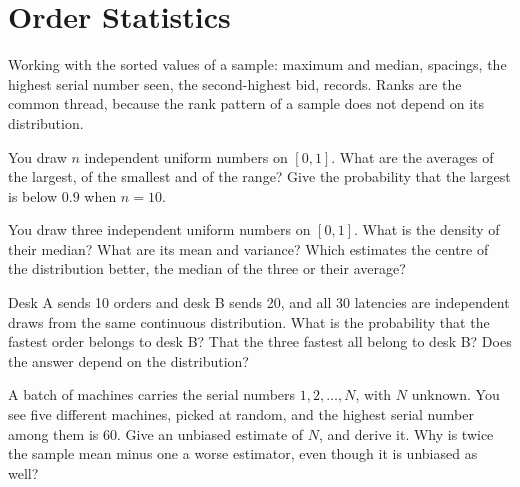 \chapter{Order Statistics}\label{ch:iv1:order-statistics}

\begin{ivtrains}
Working with the sorted values of a sample: maximum and median, spacings, the highest serial number seen, the second-highest bid, records. Ranks are the common thread, because the rank pattern of a sample does not depend on its distribution.
\end{ivtrains}

\begin{question}\label{iq:iv1:order-statistics:1}
You draw $n$ independent uniform numbers on $[0, 1]$. What are the averages of the largest, of the smallest and of the range? Give the probability that the largest is below $0.9$ when $n = 10$.
\end{question}

\begin{question}\label{iq:iv1:order-statistics:2}
You draw three independent uniform numbers on $[0, 1]$. What is the density of their median? What are its mean and variance? Which estimates the centre of the distribution better, the median of the three or their average?
\end{question}

\begin{question}\label{iq:iv1:order-statistics:3}
Desk A sends 10 orders and desk B sends 20, and all 30 latencies are independent draws from the same continuous distribution. What is the probability that the fastest order belongs to desk B? That the three fastest all belong to desk B? Does the answer depend on the distribution?
\end{question}

\begin{question}\label{iq:iv1:order-statistics:4}
A batch of machines carries the serial numbers $1, 2, \dots, N$, with $N$ unknown. You see five different machines, picked at random, and the highest serial number among them is 60. Give an unbiased estimate of $N$, and derive it. Why is twice the sample mean minus one a worse estimator, even though it is unbiased as well?
\end{question}

